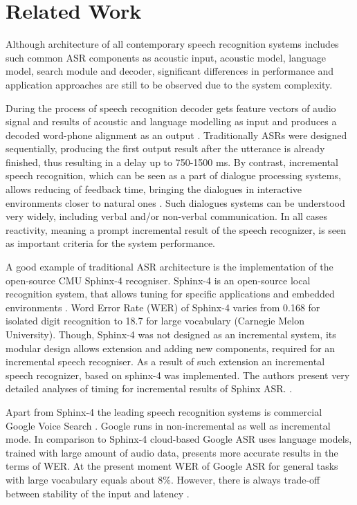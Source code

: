\chapter {Related Work}
\label{ch:relatedWork}
Although architecture of  all contemporary speech recognition systems includes
such common ASR components as acoustic input, acoustic model, language model,
search module and decoder, significant differences in performance and 
application approaches are still to be observed due to the system complexity. 


During the process of speech recognition decoder gets feature vectors of audio
signal and results of acoustic and language modelling as input and produces
a decoded word-phone alignment as an output \parencite {jurafskymartin2009}.
Traditionally ASRs were designed sequentially, producing the first output result
after the utterance is already finished, thus resulting in a delay up to
750-1500 ms. By contrast, incremental speech recognition, which can be
seen as a part of dialogue processing systems, allows reducing of feedback time,
bringing the dialogues in interactive
environments closer to natural ones \parencite {skantzeschlangen2009}. 
Such dialogues systems can be understood very widely, including verbal and/or
non-verbal communication. In all cases reactivity, meaning a prompt
incremental result of the speech recognizer, is seen as important criteria for
the system performance. 

A good example of  traditional ASR architecture is the implementation of the
open-source CMU Sphinx-4 recogniser. Sphinx-4 is an open-source local
recognition system, that allows tuning for specific applications and embedded
environments \parencite
{Lamereetal2013:Eurospeech}.  Word Error Rate (WER) of Sphinx-4 varies from 0.168 for isolated
digit recognition to 18.7 for large vocabulary (Carnegie Melon University).
Though, Sphinx-4 was not designed as an incremental system, its modular design allows extension and adding new components, required 
for an incremental speech recogniser. As a result of such extension an
incremental speech recognizer, based on sphinx-4 was implemented. The authors present very detailed analyses of timing for
incremental results of Sphinx ASR. \parencite {baumannetal2009:naacl}.

Apart from Sphinx-4 the leading speech recognition systems is commercial
Google Voice Search \parencite{schalkwyk2010}. Google runs in non-incremental as
well as incremental mode. In comparison to Sphinx-4  cloud-based Google ASR uses
language models, trained with  large amount of audio data, presents more
accurate results in the terms of WER. At the present moment WER of Google ASR for general tasks
with large vocabulary equals about 8\%. However, there is always trade-off
between stability of the input and latency \parencite {mcgrawgrauenstein2012}.

